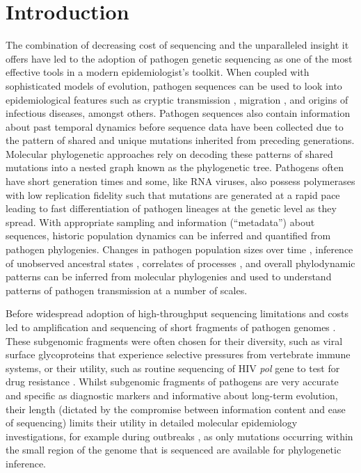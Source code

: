 \documentclass[11pt,oneside,letterpaper]{article}
\begin{document}
\pagebreak

\section*{Introduction}
The combination of decreasing cost of sequencing and the unparalleled insight it offers have led to the adoption of pathogen genetic sequencing as one of the most effective tools in a modern epidemiologist's toolkit.
When coupled with sophisticated models of evolution, pathogen sequences can be used to look into epidemiological features such as cryptic transmission \citep{faria_establishment_2017}, migration \citep{lemey_bayesian_2009,lemey_unifying_2014}, and origins \citep{smith_origins_2009} of infectious diseases, amongst others.
Pathogen sequences also contain information about past temporal dynamics before sequence data have been collected \citep{raghwani_origin_2012} due to the pattern of shared and unique mutations inherited from preceding generations.
Molecular phylogenetic approaches rely on decoding these patterns of shared mutations into a nested graph known as the phylogenetic tree.
Pathogens often have short generation times and some, like RNA viruses, also possess polymerases with low replication fidelity such that mutations are generated at a rapid pace \citep{drummond_measurably_2003,biek_measurably_2015} leading to fast differentiation of pathogen lineages at the genetic level as they spread.
With appropriate sampling and information (``metadata'') about sequences, historic population dynamics can be inferred and quantified from pathogen phylogenies.
Changes in pathogen population sizes over time \citep{pybus_integrated_2000}, inference of unobserved ancestral states \citep{lemey_bayesian_2009,dudas_mers-cov_2018}, correlates of processes \citep{faria_simultaneously_2013,lemey_unifying_2014,dudas_virus_2017}, and overall phylodynamic \citep{grenfell_unifying_2004} patterns can be inferred from molecular phylogenies and used to understand patterns of pathogen transmission at a number of scales.

Before widespread adoption of high-throughput sequencing limitations and costs led to amplification and sequencing of short fragments of pathogen genomes \citep{jin_genetic_1999,jin_proposal_2005}.
These subgenomic fragments were often chosen for their diversity, such as viral surface glycoproteins that experience selective pressures from vertebrate immune systems, or their utility, such as routine sequencing of HIV \textit{pol} gene to test for drug resistance \citep{kaye_phylogenetic_2008,rhee_human_2003}.
Whilst subgenomic fragments of pathogens are very accurate and specific as diagnostic markers and informative about long-term evolution, their length (dictated by the compromise between information content and ease of sequencing) limits their utility in detailed molecular epidemiology investigations, for example during outbreaks \citep{wohl_co-circulating_2018}, as only mutations occurring within the small region of the genome that is sequenced are available for phylogenetic inference.
\end{document}
